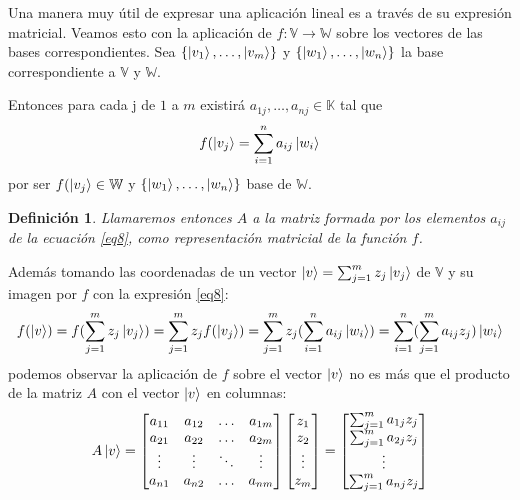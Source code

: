 \documentclass[a4paper]{article}
\newtheorem{deff}{Definición}[section]
\numberwithin{equation}{section}
\begin{document}
Una manera muy útil de expresar una aplicación lineal es a través de su expresión matricial. Veamos esto con la aplicación de $f:\mathbb{V} \longrightarrow \mathbb{W}$ sobre los vectores de las bases correspondientes. Sea $\{ \ket{v_1}, \ldots, \ket{v_m} \}$ y $\{ \ket{w_1}, \ldots, \ket{w_n} \}$ la base correspondiente a $\mathbb{V}$ y $\mathbb{W}$.

Entonces para cada j de $1$ a $m$ existirá $a_{1j}, \ldots, a_{nj} \in \mathbb{K}$ tal que
\begin{equation} \label{eq8}
f(\ket{v_j} = \sum_{i=1}^n a_{ij} \ket{w_i}
\end{equation}
por ser $f(\ket{v_j} \in \mathbb{W}$ y $\{ \ket{w_1}, \ldots, \ket{w_n} \}$ base de $\mathbb{W}$.

\begin{deff}Llamaremos entonces $A$ a la matriz formada por los elementos $a_{ij}$ de la ecuación \ref{eq8}, como representación matricial de la función $f$.
\end{deff}

Además tomando las coordenadas de un vector $\ket{v} = \sum_{j=1}^m z_j \ket{v_j}$ de $\mathbb{V}$ y su imagen por $f$ con la expresión \ref{eq8}:
\begin{equation}
f(\ket{v}) = f(\sum_{j=1}^m z_j \ket{v_j}) = \sum_{j=1}^m z_j f(\ket{v_j}) = \sum_{j=1}^m z_j (\sum_{i=1}^n a_{ij} \ket{w_i}) = 
\sum_{i=1}^n (\sum_{j=1}^m a_{ij} z_{j}) \ket{w_i}
\end{equation}
podemos observar la aplicación de $f$ sobre el vector $\ket{v}$ no es más que el producto de la matriz $A$ con el vector $\ket{v}$ en columnas:
\begin{equation}
A\ket{v} = 
\begin{bmatrix}
a_{11} & a_{12} &\ldots & a_{1m} \\
a_{21} & a_{22} &\ldots & a_{2m} \\
\vdots & \vdots &\ddots & \vdots \\
a_{n1} & a_{n2} &\ldots & a_{nm}
\end{bmatrix}
\begin{bmatrix}
z_1 \\ z_2 \\ \vdots \\ z_m
\end{bmatrix} =
\begin{bmatrix}
\sum_{j=1}^m a_{1j}z_j \\
\sum_{j=1}^m a_{2j}z_j \\
\vdots \\
\sum_{j=1}^m a_{nj}z_j \\
\end{bmatrix}
\end{equation}
\end{document}
